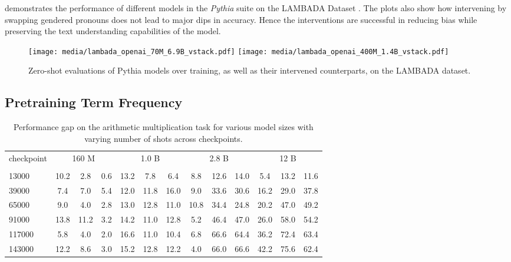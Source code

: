 \documentclass{article}
\theoremstyle{plain}
\theoremstyle{definition}
\theoremstyle{remark}
\begin{document}
 demonstrates the performance of different models in the \textit{Pythia} suite on the LAMBADA Dataset \citep{paperno2016lambada}. The plots also show how intervening by swapping gendered pronouns does not lead to major dips in accuracy. Hence the interventions are successful in reducing bias while preserving the text understanding capabilities of the model. 
\begin{figure}[!ht]
\centering
\texttt{[image: media/lambada\_openai\_70M\_6.9B\_vstack.pdf]}
\texttt{[image: media/lambada\_openai\_400M\_1.4B\_vstack.pdf]}
\caption{Zero-shot evaluations of Pythia models over training, as well as their intervened counterparts, on the LAMBADA dataset.}
\label{figure:lambada_openai}
\end{figure}

\subsection{Pretraining Term Frequency}\label{app:freqevals}

\begin{table}[ht!]
\centering
\setlength{\tabcolsep}{2pt}
\begin{tabular}{l ccc ccc ccc ccc}
\toprule
\multirow{2}{*}{checkpoint} & \multicolumn{3}{c}{160 M} & \multicolumn{3}{c}{1.0 B} & \multicolumn{3}{c}{2.8 B} & \multicolumn{3}{c}{12 B} \\
\cmidrule(lr){2-4} \cmidrule(lr){5-7} \cmidrule(lr){8-10} \cmidrule(lr){11-13}
 &  &  &  &  &  &  &  &  &  &  &  &  \\
\midrule
13000  &  10.2 &   2.8 &  0.6 &  13.2 &   7.8 &   6.4 &   8.8 &  12.6 &  14.0 &   5.4 &  13.2 &  11.6 \\
39000  &   7.4 &   7.0 &  5.4 &  12.0 &  11.8 &  16.0 &   9.0 &  33.6 &  30.6 &  16.2 &  29.0 &  37.8 \\
65000  &   9.0 &   4.0 &  2.8 &  13.0 &  12.8 &  11.0 &  10.8 &  34.4 &  24.8 &  20.2 &  47.0 &  49.2 \\
91000  &  13.8 &  11.2 &  3.2 &  14.2 &  11.0 &  12.8 &   5.2 &  46.4 &  47.0 &  26.0 &  58.0 &  54.2 \\
117000 &   5.8 &   4.0 &  2.0 &  16.6 &  11.0 &  10.4 &   6.8 &  66.6 &  64.4 &  36.2 &  72.4 &  63.4 \\
143000 &  12.2 &   8.6 &  3.0 &  15.2 &  12.8 &  12.2 &   4.0 &  66.0 &  66.6 &  42.2 &  75.6 &  62.4 \\
\bottomrule
\end{tabular}
\caption{Performance gap on the arithmetic multiplication task for various model sizes with varying number of shots across checkpoints.}
\label{table:performance-gap}
\end{table}
\end{document}
